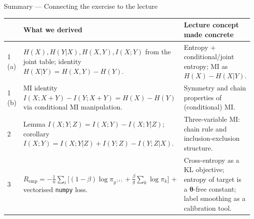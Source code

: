 \documentclass[aspectratio=169]{beamer}
\begin{document}
\begin{frame}{Summary --- Connecting the exercise to the lecture}
	\footnotesize
	\begin{center}
	\renewcommand{\arraystretch}{1.2}
	\begin{tabular}{@{}p{}p{}p{}@{}}
		\toprule
		& \textbf{What we derived} & \textbf{Lecture concept made concrete} \\
		\midrule
		1\,(a) &
			$H(X), H(Y|X), H(X,Y), I(X;Y)$ from the joint table; identity $H(X|Y) = H(X,Y) - H(Y)$. &
			Entropy + conditional/joint entropy; MI as $H(X) - H(X|Y)$. \\
		1\,(b) &
			MI identity $I(X; X{+}Y) - I(Y; X{+}Y) = H(X) - H(Y)$ via conditional MI manipulation. &
			Symmetry and chain properties of (conditional) MI. \\
		2 &
			Lemma $I(X;Y;Z) = I(X;Y) - I(X;Y|Z)$; corollary $I(X;Y) = I(X;Y|Z) + I(Y;Z) - I(Y;Z|X)$. &
			Three-variable MI: chain rule and inclusion-exclusion structure. \\
		3 &
			$R_{\text{emp}} = - \tfrac{1}{n} \sum_i \big[(1{-}\beta) \log \pi_{y^{(i)}} + \tfrac{\beta}{g}\sum_k \log \pi_k\big]$ + vectorised \texttt{numpy} loss. &
			Cross-entropy as a KL objective; entropy of target is a $\bm{\theta}$-free constant; label smoothing as a calibration tool. \\
		\bottomrule
	\end{tabular}
	\end{center}
\end{frame}
\end{document}

